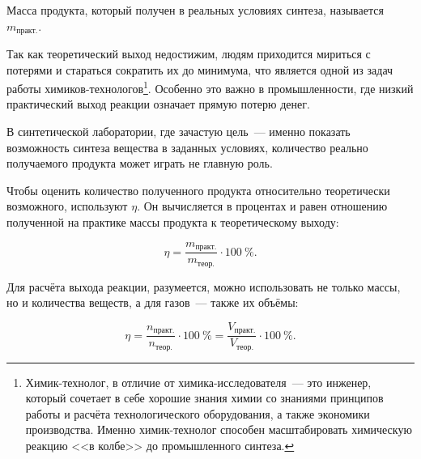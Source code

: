 Масса продукта, который получен в реальных условиях синтеза, называется  $m_{\text{практ.}}$.

Так как теоретический выход недостижим, людям приходится мириться с потерями и стараться сократить их до минимума, что является одной из задач работы химиков-технологов\footnote{Химик-технолог, в отличие от химика-исследователя~--- это инженер, который сочетает в себе хорошие знания химии со знаниями принципов работы и расчёта технологического оборудования, а также экономики производства. Именно химик-технолог способен масштабировать химическую реакцию <<в колбе>> до промышленного синтеза.}. Особенно это важно в промышленности, где низкий практический выход реакции означает прямую потерю денег.

В синтетической лаборатории, где зачастую цель~--- именно показать возможность синтеза вещества в заданных условиях, количество реально получаемого продукта может играть не главную роль.

Чтобы оценить количество полученного продукта относительно теоретически возможного, используют  $\eta$. Он вычисляется в процентах и равен отношению полученной на практике массы продукта к теоретическому выходу:

\begin{equation}
    \label{eq:yield}
    \boxed{\eta = \frac{m_{\text{практ.}}}{m_{\text{теор.}}} \cdot \qty{100}{\percent}}.
\end{equation}

Для расчёта выхода реакции, разумеется, можно использовать не только массы, но и количества веществ, а для газов~--- также их объёмы:

\begin{equation*}
    \eta = \frac{n_{\text{практ.}}}{n_{\text{теор.}}} \cdot \qty{100}{\percent} = \frac{V_{\text{практ.}}}{V_{\text{теор.}}} \cdot \qty{100}{\percent}.
\end{equation*}

